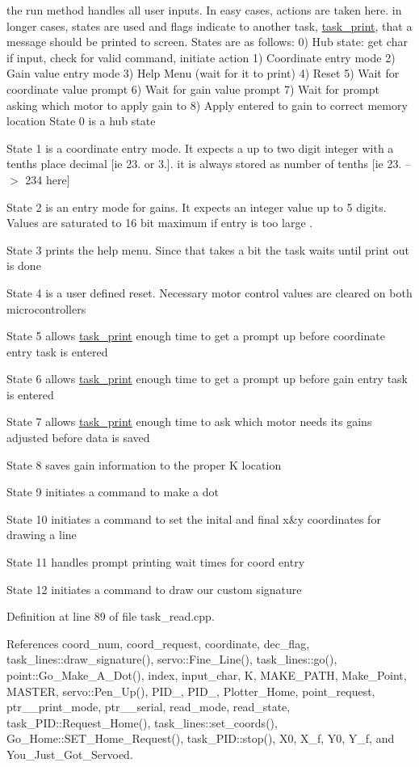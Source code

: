 the run method handles all user inputs. In easy cases, actions are taken here. in longer cases, states are used and flags indicate to another task, \hyperlink{classtask__print}{task\-\_\-print}, that a message should be printed to screen. States are as follows\-: 0) Hub state\-: get char if input, check for valid command, initiate action 1) Coordinate entry mode 2) Gain value entry mode 3) Help Menu (wait for it to print) 4) Reset 5) Wait for coordinate value prompt 6) Wait for gain value prompt 7) Wait for prompt asking which motor to apply gain to 8) Apply entered to gain to correct memory location State 0 is a hub state

State 1 is a coordinate entry mode. It expects a up to two digit integer with a tenths place decimal \mbox{[}ie 23. or 3.\mbox{]}. it is always stored as number of tenths \mbox{[}ie 23. --$>$ 234 here\mbox{]}

State 2 is an entry mode for gains. It expects an integer value up to 5 digits. Values are saturated to 16 bit maximum if entry is too large .

State 3 prints the help menu. Since that takes a bit the task waits until print out is done

State 4 is a user defined reset. Necessary motor control values are cleared on both microcontrollers

State 5 allows \hyperlink{classtask__print}{task\-\_\-print} enough time to get a prompt up before coordinate entry task is entered

State 6 allows \hyperlink{classtask__print}{task\-\_\-print} enough time to get a prompt up before gain entry task is entered

State 7 allows \hyperlink{classtask__print}{task\-\_\-print} enough time to ask which motor needs its gains adjusted before data is saved

State 8 saves gain information to the proper K location

State 9 initiates a command to make a dot

State 10 initiates a command to set the inital and final x\&y coordinates for drawing a line

State 11 handles prompt printing wait times for coord entry

State 12 initiates a command to draw our custom signature 

Definition at line 89 of file task\-\_\-read.\-cpp.



References coord\-\_\-num, coord\-\_\-request, coordinate, dec\-\_\-flag, task\-\_\-lines\-::draw\-\_\-signature(), servo\-::\-Fine\-\_\-\-Line(), task\-\_\-lines\-::go(), point\-::\-Go\-\_\-\-Make\-\_\-\-A\-\_\-\-Dot(), index, input\-\_\-char, K, M\-A\-K\-E\-\_\-\-P\-A\-T\-H, Make\-\_\-\-Point, M\-A\-S\-T\-E\-R, servo\-::\-Pen\-\_\-\-Up(), P\-I\-D\-\_, P\-I\-D\-\_, Plotter\-\_\-\-Home, point\-\_\-request, ptr\-\_\-\_\-print\-\_\-mode, ptr\-\_\-\_\-serial, read\-\_\-mode, read\-\_\-state, task\-\_\-\-P\-I\-D\-::\-Request\-\_\-\-Home(), task\-\_\-lines\-::set\-\_\-coords(), Go\-\_\-\-Home\-::\-S\-E\-T\-\_\-\-Home\-\_\-\-Request(), task\-\_\-\-P\-I\-D\-::stop(), X0, X\-\_\-f, Y0, Y\-\_\-f, and You\-\_\-\-Just\-\_\-\-Got\-\_\-\-Servoed.



